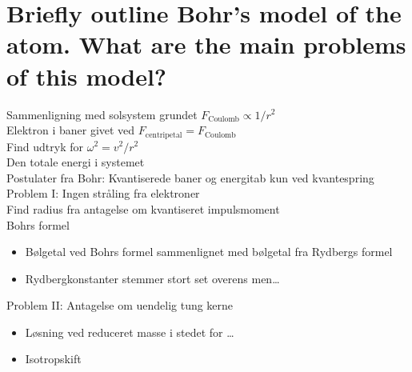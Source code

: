 \section{Briefly outline Bohr's model of the atom. What are the main problems of this model?}

\noindent
\large
Sammenligning med solsystem grundet $F_\text{Coulomb} \propto 1/r^2$\\
Elektron i baner givet ved $F_\text{centripetal} = F_\text{Coulomb}$\\
Find udtryk for $\omega^2 = v^2/r^2$\\
Den totale energi i systemet\\
Postulater fra Bohr: Kvantiserede baner og energitab kun ved kvantespring\\
Problem I: Ingen stråling fra elektroner\\
Find radius fra antagelse om kvantiseret impulsmoment\\
Bohrs formel
\begin{itemize}
    \item Bølgetal ved Bohrs formel sammenlignet med bølgetal fra Rydbergs formel
    \item Rydbergkonstanter stemmer stort set overens men\ldots
\end{itemize}
Problem II: Antagelse om uendelig tung kerne
\begin{itemize}
    \item Løsning ved reduceret masse i stedet for \ldots
    \item Isotropskift
\end{itemize}
\normalsize